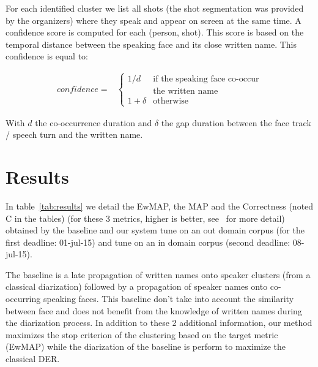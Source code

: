 \documentclass{acm_proc_article-me}
\begin{document}
For each identified cluster we list all shots (the shot segmentation was provided by the organizers) where they speak and appear on screen at the same time. A confidence score is computed for each (person, shot). This score is based on the temporal distance between the speaking face and its close written name. This confidence is equal to:

\begin{align*}
  confidence = & \left\{ 
  	\begin{array}{ll}
  		1/d  & \mbox{if the speaking face co-occur}  \\
  		 	 & \mbox{the written name}		\\
  		1+\delta &\mbox{otherwise}
  	\end{array} 
  \right.
\end{align*}

With $d$ the co-occurrence duration and $\delta$ the gap duration between the face track / speech turn and the written name.




\section{Results}

In table~\ref{tab:results} we detail the EwMAP, the MAP and the Correctness (noted C in the tables) (for these 3 metrics, higher is better, see~\cite{POIGNANT--MEDIAEVAL--2015} for more detail) obtained by the baseline and our system tune on an out domain corpus (for the first deadline: 01-jul-15) and tune on an in domain corpus (second deadline: 08-jul-15).

The baseline is a late propagation of written names onto speaker clusters (from a classical diarization) followed by a propagation of speaker names onto co-occurring speaking faces. This baseline don't take into account the similarity between face and does not benefit from the knowledge of written names during the diarization process. In addition to these 2 additional information, our method maximizes the stop criterion of the clustering based on the target metric (EwMAP) while the diarization of the baseline is perform to maximize the classical DER. 
\end{document}
